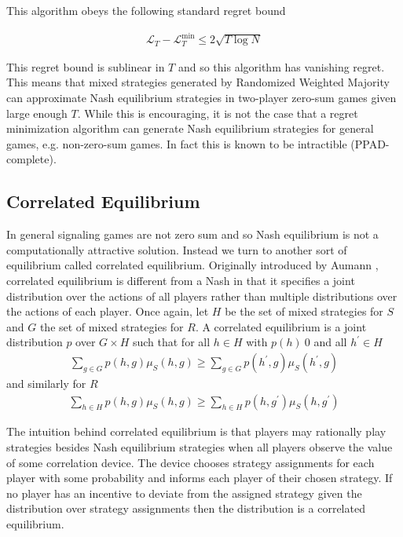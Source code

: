 \documentclass{article}
\begin{document}
This algorithm obeys the following standard regret bound \cite{mohri2012foundations}

\begin{align*}
\mathcal{L}_T - \mathcal{L}_T^{\text{min}} \le 2\sqrt{T \log N}
\end{align*}

This regret bound is sublinear in $T$ and so this algorithm has vanishing regret. This means that mixed strategies generated by Randomized Weighted Majority can approximate Nash equilibrium strategies in two-player zero-sum games given large enough $T$. While this is encouraging, it is not the case that a regret minimization algorithm can generate Nash equilibrium strategies for general games, e.g. non-zero-sum games. In fact this is known to be intractible (PPAD-complete\cite{daskalakis2009complexity}).

\subsection{Correlated Equilibrium}

In general signaling games are not zero sum and so Nash equilibrium is not a computationally attractive solution. Instead we turn to another sort of equilibrium called correlated equilibrium. Originally introduced by Aumann \cite{aumann1974subjectivity}\cite{aumann1987correlated}, correlated equilibrium is different from a Nash in that it specifies a joint distribution over the actions of all players rather than multiple distributions over the actions of each player. Once again, let $H$ be the set of mixed strategies for $S$ and $G$ the set of mixed strategies for $R$. A correlated equilibrium is a joint distribution $p$ over $G \times H$ such that for all $h\in H$ with $p(h) \> 0$ and all $h^\prime \in H$
\begin{align*}
\sum_{g \in G} p(h,g)\mu_S(h, g) \ge \sum_{g \in G} p(h^\prime,g)\mu_S(h^\prime, g)
\end{align*}
\noindent and similarly for $R$
\begin{align*}
\sum_{h \in H} p(h,g)\mu_S(h, g) \ge \sum_{h \in H} p(h,g^\prime)\mu_S(h, g^\prime)
\end{align*}

The intuition behind correlated equilibrium is that players may rationally play strategies besides Nash equilibrium strategies when all players observe the value of some correlation device. The device chooses strategy assignments for each player with some probability and informs each player of their chosen strategy. If no player has an incentive to deviate from the assigned strategy given the distribution over strategy assignments then the distribution is a correlated equilibrium.
\end{document}
